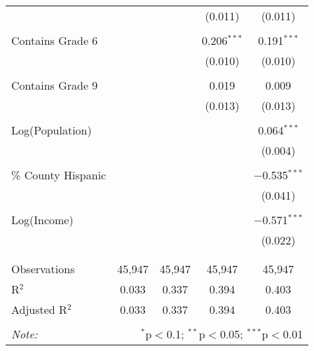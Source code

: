 \begin{table}[!htbp]
\begin{tabular}{@{\extracolsep{-2pt}}lcccc}
  &  &  & (0.011) & (0.011) \\ 
  & & & & \\ 
 Contains Grade 6 &  &  & 0.206$^{***}$ & 0.191$^{***}$ \\ 
  &  &  & (0.010) & (0.010) \\ 
  & & & & \\ 
 Contains Grade 9 &  &  & 0.019 & 0.009 \\ 
  &  &  & (0.013) & (0.013) \\ 
  & & & & \\ 
 Log(Population) &  &  &  & 0.064$^{***}$ \\ 
  &  &  &  & (0.004) \\ 
  & & & & \\ 
 \% County Hispanic &  &  &  & $-$0.535$^{***}$ \\ 
  &  &  &  & (0.041) \\ 
  & & & & \\ 
 Log(Income) &  &  &  & $-$0.571$^{***}$ \\ 
  &  &  &  & (0.022) \\ 
  & & & & \\ 
\hline \\[-1.8ex] 
Observations & 45,947 & 45,947 & 45,947 & 45,947 \\ 
R$^{2}$ & 0.033 & 0.337 & 0.394 & 0.403 \\ 
Adjusted R$^{2}$ & 0.033 & 0.337 & 0.394 & 0.403 \\ 
\hline 
\hline \\[-1.8ex] 
\textit{Note:}  & \multicolumn{4}{r}{$^{*}$p$<$0.1; $^{**}$p$<$0.05; $^{***}$p$<$0.01} \\ 
\end{tabular} 
\end{table} 
